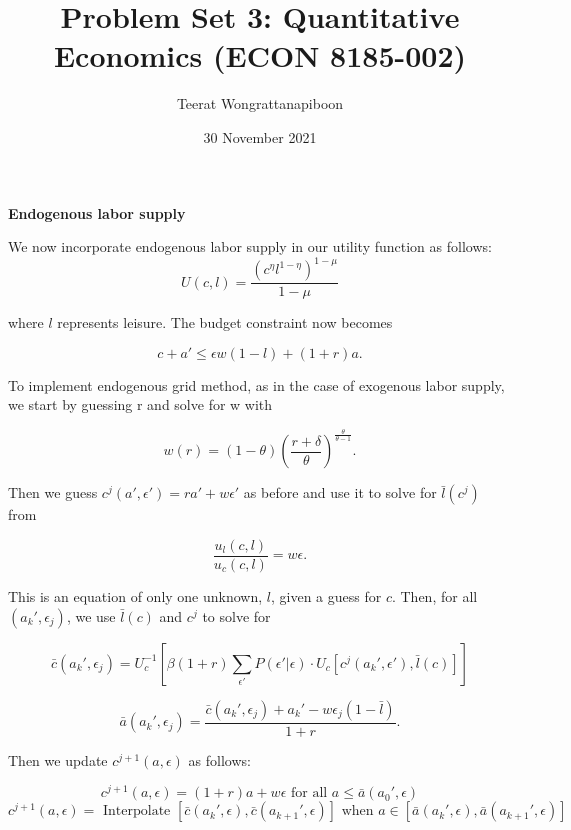 \documentclass{article}
\title{Problem Set 3: Quantitative Economics (ECON 8185-002)}
\author{Teerat Wongrattanapiboon}
\date{30 November 2021}
\begin{document}
	\maketitle
	
	\noindent\textbf{Endogenous labor supply}
	
		We now incorporate endogenous labor supply in our utility function as follows:
		$$U(c,l) =  \frac{(c^\eta l^{1-\eta})^{1-\mu}}{1-\mu}$$
		
		where $l$ represents leisure. The budget constraint now becomes
		
		$$c+a' \leq \epsilon w (1 - l) + (1 + r)a.$$
		
		To implement endogenous grid method, as in the case of exogenous labor supply, we start by 		        guessing r and solve for w with
		
		$$w(r) = (1-\theta)\left(\frac{r+\delta}{\theta}\right)^{\frac{\theta}{\theta-1}}. $$
		
		Then we guess $c^{j}(a',\epsilon') = ra' + w\epsilon'$ as before and use it to solve for 
		$\bar{l}(c^{j})$ from
		
		$$\frac{u_{l}(c,l)}{u_{c}(c,l)} = w\epsilon.$$
		
		This is an equation of only one unknown, $l$, given a guess for $c$. Then, for all $(a_{k}',\epsilon_{j})$, we use $\bar{l}(c)$ and $c^{j}$ to solve for 
		
		$$\bar{c}(a_{k}', \epsilon_{j}) = U_{c}^{-1}\left[ \beta (1+r) \sum_{\epsilon'}P(\epsilon'|\epsilon) \cdot U_{c}\left[ c^{j}(a_{k}',\epsilon'),\bar{l}(c) \right] \right]$$
		
		$$\bar{a}(a_{k}', \epsilon_{j}) = \frac{\bar{c}(a_{k}', \epsilon_{j}) + a_{k}' - w\epsilon_{j}(1-\bar{l})}{1+r}.$$
		
		Then we update $c^{j+1}(a,\epsilon)$ as follows:
		
		$$c^{j+1}(a,\epsilon) = (1+r)a + w\epsilon \text{ for all } a \leq \bar{a}(a_{0}', \epsilon)$$
		$$c^{j+1}(a,\epsilon) = \text{ Interpolate } [\bar{c}(a_{k}', \epsilon), \bar{c}(a_{k+1}', \epsilon)] \text{ when } a \in [\bar{a}(a_{k}', \epsilon), \bar{a}(a_{k+1}', \epsilon)]$$
	
	
	
\end{document}
